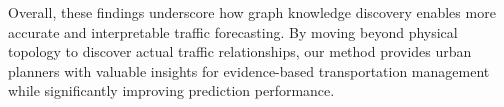 \documentclass[pdflatex,sn-mathphys-num]{sn-jnl}%
\theoremstyle{thmstyleone}%
\theoremstyle{thmstyletwo}%
\theoremstyle{thmstylethree}%
\begin{document}
Overall, these findings underscore how graph knowledge discovery enables more accurate and interpretable traffic forecasting. By moving beyond physical topology to discover actual traffic relationships, our method provides urban planners with valuable insights for evidence-based transportation management while significantly improving prediction performance.

%
%
%
%
%
%
\end{document}
